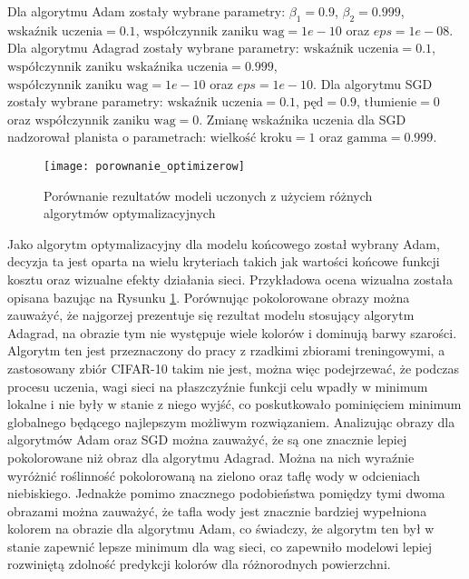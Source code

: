   \noindent
  Dla algorytmu Adam zostały wybrane parametry: $\beta_{1} = 0.9$, $\beta_{2} = 0.999$,
  $\text{wskaźnik uczenia} = 0.1$, $\text{współczynnik zaniku wag} = 1e-10$ oraz
  $eps=1e-08$.
  \newline
  Dla algorytmu Adagrad zostały wybrane parametry: $\text{wskaźnik uczenia} = 0.1$,
  $\text{współczynnik zaniku wskaźnika uczenia} = 0.999$,
  $\text{współczynnik zaniku wag} = 1e-10$ oraz $eps=1e-10$.
  \newline
  Dla algorytmu SGD zostały wybrane parametry: $\text{wskaźnik uczenia} = 0.1$,
  $\text{pęd} = 0.9$, $\text{tłumienie} = 0$ oraz $\text{współczynnik zaniku wag} = 0$.
  Zmianę wskaźnika uczenia dla SGD nadzorował planista o parametrach:
  $\text{wielkość kroku} = 1$ oraz $\text{gamma} = 0.999$.

  \begin{figure}[H]
   \centering
   \texttt{[image: porownanie\_optimizerow]}
   \caption[Porównanie rezultatów modeli uczonych z użyciem różnych algorytmów
   optymalizacyjnych - źródło rysunek własny na podstawie: \url{https://cdn.thearthunters.com/wp-content/uploads/2013/06/bg-960x636.jpg}]
   {Porównanie rezultatów modeli uczonych z użyciem różnych algorytmów
   optymalizacyjnych}
   \label{fig:porownanie_optimizerow}
  \end{figure}

  \noindent
  Jako algorytm optymalizacyjny dla modelu końcowego został wybrany Adam,
  decyzja ta jest oparta na wielu kryteriach takich jak wartości końcowe funkcji
  kosztu oraz wizualne efekty działania sieci. Przykładowa ocena wizualna
  została opisana bazując na Rysunku \ref{fig:porownanie_optimizerow}.
  Porównując pokolorowane obrazy można zauważyć, że najgorzej prezentuje się
  rezultat modelu stosujący algorytm Adagrad, na obrazie tym nie występuje wiele
  kolorów i dominują barwy szarości. Algorytm ten jest przeznaczony do
  pracy z rzadkimi zbiorami treningowymi, a zastosowany zbiór CIFAR-10 takim nie
  jest, można więc podejrzewać, że podczas procesu uczenia, wagi sieci na
  płaszczyźnie funkcji celu wpadły w minimum lokalne i nie były w stanie z niego
  wyjść, co poskutkowało pominięciem minimum globalnego będącego najlepszym
  możliwym rozwiązaniem. Analizując obrazy dla algorytmów Adam oraz SGD
  można zauważyć, że są one znacznie lepiej pokolorowane niż obraz dla
  algorytmu Adagrad. Można na nich wyraźnie wyróżnić roślinność pokolorowaną
  na zielono oraz taflę wody w odcieniach niebiskiego. Jednakże pomimo
  znacznego podobieństwa pomiędzy tymi dwoma obrazami można zauważyć, że tafla
  wody jest znacznie bardziej wypełniona kolorem na obrazie dla algorytmu Adam,
  co świadczy, że algorytm ten był w stanie zapewnić lepsze minimum dla wag
  sieci, co zapewniło modelowi lepiej rozwiniętą zdolność predykcji kolorów dla
  różnorodnych powierzchni.

